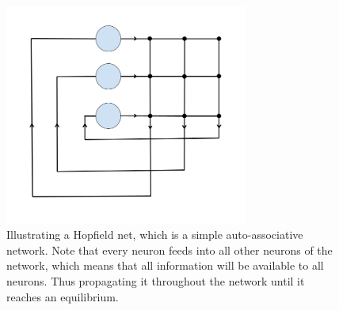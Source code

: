 \begin{figure}
    \centering
    \includegraphics[width=8cm]{fig/hopfield-net.png}
    \caption{Illustrating a Hopfield net, which is a simple auto-associative network. Note that every neuron feeds into all other neurons of the network, which means that all information will be available to all neurons. Thus propagating it throughout the network until it reaches an equilibrium.}
    \label{fig:hopfield-net}
\end{figure}

